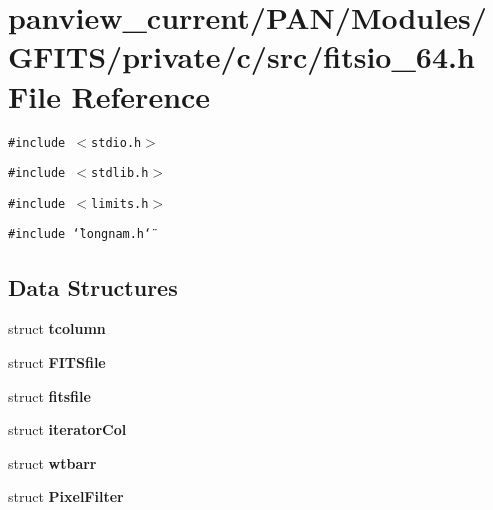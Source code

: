 \section{panview\_\-current/PAN/Modules/GFITS/private/c/src/fitsio\_\-64.h File Reference}
\label{fitsio__64_8h}
{\tt \#include $<$stdio.h$>$}\par
{\tt \#include $<$stdlib.h$>$}\par
{\tt \#include $<$limits.h$>$}\par
{\tt \#include \char`\"{}longnam.h\char`\"{}}\par
\subsection*{Data Structures}
\begin{CompactItemize}
\item 
struct \bf{tcolumn}
\item 
struct \bf{FITSfile}
\item 
struct \bf{fitsfile}
\item 
struct \bf{iterator\-Col}
\item 
struct \bf{wtbarr}
\item 
struct \bf{Pixel\-Filter}
\end{CompactItemize}
